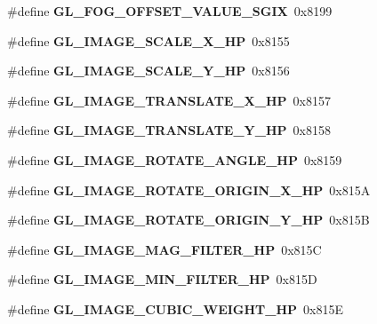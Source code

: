 \begin{DoxyCompactItemize}
\item 
\#define {\bfseries G\+L\+\_\+\+F\+O\+G\+\_\+\+O\+F\+F\+S\+E\+T\+\_\+\+V\+A\+L\+U\+E\+\_\+\+S\+G\+I\+X}~0x8199\label{_s_d_l__opengl_8h_a00137dbb4d51895d9d8ff31feba295bc}

\item 
\#define {\bfseries G\+L\+\_\+\+I\+M\+A\+G\+E\+\_\+\+S\+C\+A\+L\+E\+\_\+\+X\+\_\+\+H\+P}~0x8155\label{_s_d_l__opengl_8h_ace2f80aeb1328b384a85b216c6db1822}

\item 
\#define {\bfseries G\+L\+\_\+\+I\+M\+A\+G\+E\+\_\+\+S\+C\+A\+L\+E\+\_\+\+Y\+\_\+\+H\+P}~0x8156\label{_s_d_l__opengl_8h_adb58b01b5d70006dab08615daf702bf8}

\item 
\#define {\bfseries G\+L\+\_\+\+I\+M\+A\+G\+E\+\_\+\+T\+R\+A\+N\+S\+L\+A\+T\+E\+\_\+\+X\+\_\+\+H\+P}~0x8157\label{_s_d_l__opengl_8h_a013394211449666f17b23151c56ac7ff}

\item 
\#define {\bfseries G\+L\+\_\+\+I\+M\+A\+G\+E\+\_\+\+T\+R\+A\+N\+S\+L\+A\+T\+E\+\_\+\+Y\+\_\+\+H\+P}~0x8158\label{_s_d_l__opengl_8h_add3ec614937a860af340f17d72452bac}

\item 
\#define {\bfseries G\+L\+\_\+\+I\+M\+A\+G\+E\+\_\+\+R\+O\+T\+A\+T\+E\+\_\+\+A\+N\+G\+L\+E\+\_\+\+H\+P}~0x8159\label{_s_d_l__opengl_8h_a7b509514c581b7bdbf817bcc55d6ce74}

\item 
\#define {\bfseries G\+L\+\_\+\+I\+M\+A\+G\+E\+\_\+\+R\+O\+T\+A\+T\+E\+\_\+\+O\+R\+I\+G\+I\+N\+\_\+\+X\+\_\+\+H\+P}~0x815\+A\label{_s_d_l__opengl_8h_a2d3e9223931ab5829ee9e62ecc09d335}

\item 
\#define {\bfseries G\+L\+\_\+\+I\+M\+A\+G\+E\+\_\+\+R\+O\+T\+A\+T\+E\+\_\+\+O\+R\+I\+G\+I\+N\+\_\+\+Y\+\_\+\+H\+P}~0x815\+B\label{_s_d_l__opengl_8h_adf3d126b7e9cbf89377c4e361ed362e1}

\item 
\#define {\bfseries G\+L\+\_\+\+I\+M\+A\+G\+E\+\_\+\+M\+A\+G\+\_\+\+F\+I\+L\+T\+E\+R\+\_\+\+H\+P}~0x815\+C\label{_s_d_l__opengl_8h_ace2e09289afcc0a60d082dd6b857195e}

\item 
\#define {\bfseries G\+L\+\_\+\+I\+M\+A\+G\+E\+\_\+\+M\+I\+N\+\_\+\+F\+I\+L\+T\+E\+R\+\_\+\+H\+P}~0x815\+D\label{_s_d_l__opengl_8h_acac8c9c8d17320803c525de39c99059e}

\item 
\#define {\bfseries G\+L\+\_\+\+I\+M\+A\+G\+E\+\_\+\+C\+U\+B\+I\+C\+\_\+\+W\+E\+I\+G\+H\+T\+\_\+\+H\+P}~0x815\+E\label{_s_d_l__opengl_8h_a78ed0b9bd253794d2c41835dec2e7beb}


\end{DoxyCompactItemize}
